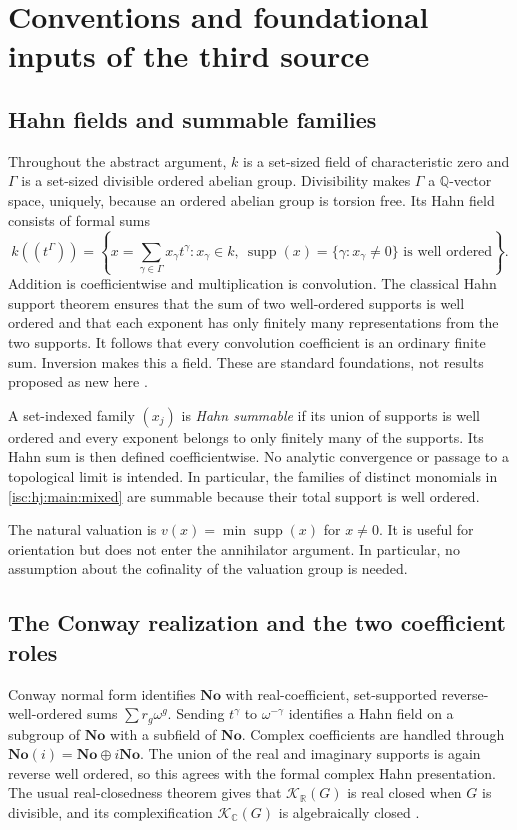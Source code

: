 \documentclass[11pt,letterpaper]{article}
\theoremstyle{definition}
\theoremstyle{remark}
\newcommand{\No}{\mathbf{No}}
\newcommand{\R}{\mathbb R}
\newcommand{\C}{\mathbb C}
\newcommand{\Q}{\mathbb Q}
\newcommand{\K}[2]{\mathcal K_{#1}(#2)}
\newcommand{\supp}{\operatorname{supp}}
\numberwithin{equation}{section}
\begin{document}
\section{Conventions and foundational inputs of the third source}
\label{isc:hj:sec:foundations}

\subsection{Hahn fields and summable families}

Throughout the abstract argument, $k$ is a set-sized field of
characteristic zero and $\Gamma$ is a set-sized divisible ordered abelian
group. Divisibility makes $\Gamma$ a $\Q$-vector space, uniquely, because
an ordered abelian group is torsion free. Its Hahn field consists of
formal sums
\[
 k((t^\Gamma))=
 \left\{x=\sum_{\gamma\in\Gamma}x_\gamma t^\gamma:
 x_\gamma\in k,\ \supp(x)=\{\gamma:x_\gamma\ne0\}
 \text{ is well ordered}\right\}.
\]
Addition is coefficientwise and multiplication is convolution. The
classical Hahn support theorem ensures that the sum of two well-ordered
supports is well ordered and that each exponent has only finitely many
representations from the two supports. It follows that every convolution
coefficient is an ordinary finite sum. Inversion makes this a field.
These are standard foundations, not results proposed as new here
\cite{Hahn,Gonshor}.

A set-indexed family $(x_j)$ is \emph{Hahn summable} if its union of
supports is well ordered and every exponent belongs to only finitely many
of the supports. Its Hahn sum is then defined coefficientwise. No
analytic convergence or passage to a topological limit is intended.
In particular, the families of distinct monomials in \cref{isc:hj:main:mixed}
are summable because their total support is well ordered.

The natural valuation is $v(x)=\min\supp(x)$ for $x\ne0$. It is useful for
orientation but does not enter the annihilator argument. In particular, no
assumption about the cofinality of the valuation group is needed.

\subsection{The Conway realization and the two coefficient roles}

Conway normal form identifies $\No$ with real-coefficient, set-supported
reverse-well-ordered sums $\sum r_g\omega^g$. Sending $t^\gamma$ to
$\omega^{-\gamma}$ identifies a Hahn field on a subgroup of $\No$ with
a subfield of $\No$. Complex coefficients are handled through
$\No(i)=\No\oplus i\No$. The union of the real and imaginary supports
is again reverse well ordered, so this agrees with the formal complex
Hahn presentation. The usual real-closedness theorem gives that
$\K{\R}{G}$ is real closed when $G$ is divisible, and its
complexification $\K{\C}{G}$ is algebraically closed
\cite{Gonshor,Kaplansky}.
\end{document}
